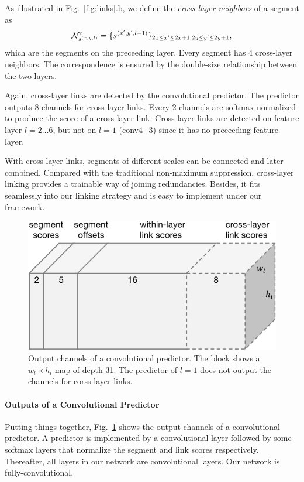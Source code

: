 \documentclass[10pt,twocolumn,letterpaper]{article}
\begin{document}
As illustrated in Fig.~\ref{fig:links}.b, we define the \emph{cross-layer neighbors} of a segment as
\begin{dmath}
  {\cal N}^{c}_{s^{(x,y,l)}} = \{ s^{(x',y',l-1)} \}_{2x \leq x' \leq 2x+1, 2y\leq y' \leq 2y+1},
\end{dmath}
which are the segments on the preceeding layer.
Every segment has 4 cross-layer neighbors.
The correspondence is ensured by the double-size relationship between the two layers.

Again, cross-layer links are detected by the convolutional predictor.
The predictor outputs 8 channels for cross-layer links.
Every 2 channels are softmax-normalized to produce the score of a cross-layer link.
Cross-layer links are detected on feature layer $l=2\dots 6$, but not on $l=1$ (conv4\_3) since it has no preceeding feature layer.

With cross-layer links, segments of different scales can be connected and later combined.
Compared with the traditional non-maximum suppression,
cross-layer linking provides a trainable way of joining redundancies.
Besides, it fits seamlessly into our linking strategy and is easy to implement under our framework.


\begin{figure}[h]
  \centering
  \includegraphics[width=0.6\linewidth]{figures/predictor-output.pdf}
  \caption{Output channels of a convolutional predictor. The block shows a $w_l \times h_l$ map of depth 31. The predictor of $l=1$ does not output the channels for corss-layer links.}
  \label{fig:predictor-output}
\end{figure}

\paragraph{Outputs of a Convolutional Predictor} Putting things together, Fig.~\ref{fig:predictor-output} shows the output channels of a convolutional predictor.
A predictor is implemented by a convolutional layer followed by some softmax layers that normalize the segment and link scores respectively.
Thereafter, all layers in our network are convolutional layers.
Our network is fully-convolutional.
\end{document}
